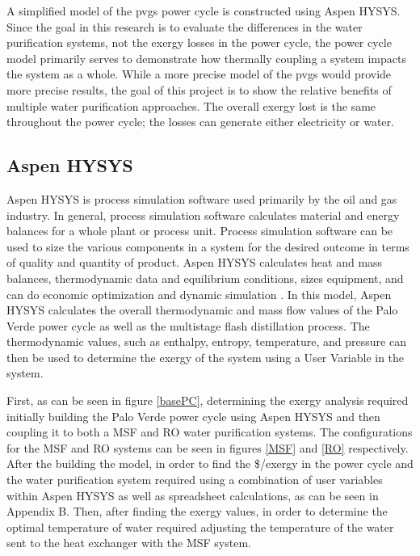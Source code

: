A simplified model of the \ac{pvgs} power cycle is constructed using Aspen HYSYS.  Since the goal in this research is to evaluate the differences in the water purification systems, not the exergy losses in the power cycle, the power cycle model primarily serves to demonstrate how thermally coupling a system impacts the system as a whole. While a more precise model of the \ac{pvgs} would provide more precise results, the goal of this project is to show the relative benefits of multiple water purification approaches. The overall exergy lost is the same throughout the power cycle; the losses can generate either electricity or water.

\subsection{Aspen HYSYS}

Aspen HYSYS is process simulation software used primarily by the oil and gas industry. In general, process simulation software calculates material and energy balances for a whole plant or process unit. Process simulation software can be used to size the various components in a system for the desired outcome in terms of quality and quantity of product. Aspen HYSYS calculates heat and mass balances, thermodynamic data and equilibrium conditions, sizes equipment, and can do economic optimization and dynamic simulation \cite{Oi2017}. In this model, Aspen HYSYS calculates the overall thermodynamic and mass flow values of the Palo Verde power cycle as well as the multistage flash distillation process. The thermodynamic values, such as enthalpy, entropy, temperature, and pressure can then be used to determine the exergy of the system using a User Variable in the system.

First, as can be seen in figure \ref{basePC}, determining the exergy analysis required initially building the Palo Verde power cycle using Aspen HYSYS and then coupling it to both a MSF and RO water purification systems. The configurations for the MSF and RO systems can be seen in figures \ref{MSF} and \ref{RO} respectively. After the building the model, in order to find  the \$/exergy in the power cycle and the water purification system required using a combination of user variables within Aspen HYSYS as well as spreadsheet calculations, as can be seen in Appendix B. Then, after finding the exergy values, in order to determine the optimal temperature of water required adjusting the temperature of the water sent to the heat exchanger with the MSF system.

